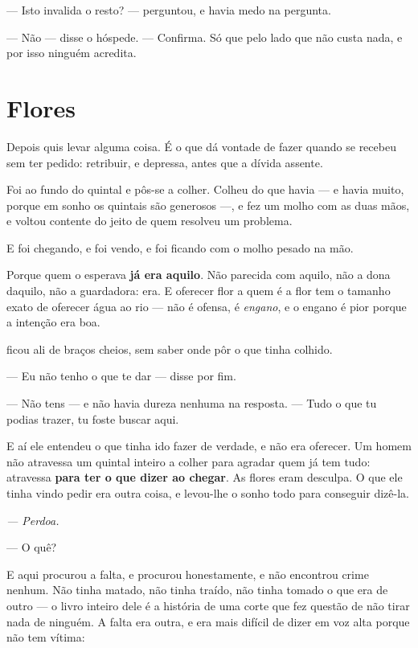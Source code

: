 \documentclass[livro.tex]{subfiles}
\begin{document}
\medskip
\noindent --- Isto invalida o resto? --- perguntou, e havia medo na pergunta.

--- Não --- disse o hóspede. --- Confirma. Só que pelo lado que não custa
nada, e por isso ninguém acredita.

\chapter{Flores}

Depois quis levar alguma coisa. É o que dá vontade de fazer quando se recebeu
sem ter pedido: retribuir, e depressa, antes que a dívida assente.

Foi ao fundo do quintal e pôs-se a colher. Colheu do que havia --- e havia
muito, porque em sonho os quintais são generosos ---, e fez um molho com as
duas mãos, e voltou contente do jeito de quem resolveu um problema.

\medskip
\noindent E foi chegando, e foi vendo, e foi ficando com o molho pesado na mão.

\medskip
\noindent Porque quem o esperava \textbf{já era aquilo}. Não parecida com
aquilo, não a dona daquilo, não a guardadora: era. E oferecer flor a quem é a
flor tem o tamanho exato de oferecer água ao rio --- não é ofensa, é
\emph{engano}, e o engano é pior porque a intenção era boa.

\medskip
\noindent \Ben ficou ali de braços cheios, sem saber onde pôr o que tinha
colhido.

--- Eu não tenho o que te dar --- disse por fim.

--- Não tens --- e não havia dureza nenhuma na resposta. --- Tudo o que tu
podias trazer, tu foste buscar aqui.

\medskip
\noindent E aí ele entendeu o que tinha ido fazer de verdade, e não era
oferecer. Um homem não atravessa um quintal inteiro a colher para agradar quem
já tem tudo: atravessa \textbf{para ter o que dizer ao chegar}. As flores eram
desculpa. O que ele tinha vindo pedir era outra coisa, e levou-lhe o sonho todo
para conseguir dizê-la.

\begin{center}
\emph{--- Perdoa.}
\end{center}

\medskip
\noindent --- O quê?

E aqui \Ben procurou a falta, e procurou honestamente, e não encontrou crime
nenhum. Não tinha matado, não tinha traído, não tinha tomado o que era de
outro --- o livro inteiro dele é a história de uma corte que fez questão de não
tirar nada de ninguém. A falta era outra, e era mais difícil de dizer em voz
alta porque não tem vítima:
\end{document}
